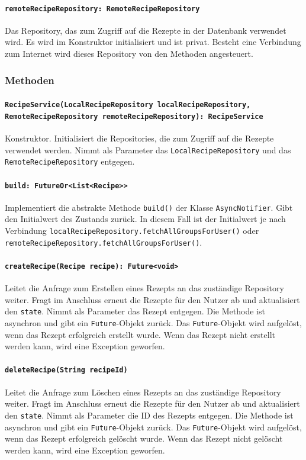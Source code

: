 \documentclass{entwurfsheft}
\begin{document}
\paragraph{\texttt{remoteRecipeRepository: RemoteRecipeRepository}}
Das Repository, das zum Zugriff auf die Rezepte in der Datenbank verwendet wird. Es wird im Konstruktor initialisiert und ist privat. Besteht eine Verbindung zum Internet wird dieses Repository von den Methoden angesteuert.
\subsubsection*{Methoden}
\paragraph{\texttt{RecipeService(LocalRecipeRepository localRecipeRepository, RemoteRecipeRepository remoteRecipeRepository): RecipeService\\}}
Konstruktor. Initialisiert die Repositories, die zum Zugriff auf die Rezepte verwendet werden. Nimmt als Parameter das \texttt{LocalRecipeReposi\-tory} und das \texttt{RemoteRecipeRepository} entgegen.
\paragraph{\texttt{build: FutureOr<List<Recipe>>}}
Implementiert die abstrakte Methode \texttt{build()} der Klasse \texttt{AsyncNotifier}. Gibt den Initialwert des Zustands zurück. In diesem Fall ist der Initialwert je nach Verbindung \texttt{localRecipeRepository.fetchAllGroupsForUser()} oder \texttt{remoteRecipeRe\-pository.fetchAllGroupsForUser()}.
\paragraph{\texttt{createRecipe(Recipe recipe): Future<void>}}
Leitet die Anfrage zum Erstellen eines Rezepts an das zuständige Repository weiter. Fragt im Anschluss erneut die Rezepte für den Nutzer ab und aktualisiert den \texttt{state}. Nimmt als Parameter das Rezept entgegen. Die Methode ist asynchron und gibt ein \texttt{Future}-Objekt zurück. Das \texttt{Future}-Objekt wird aufgelöst, wenn das Rezept erfolgreich erstellt wurde. Wenn das Rezept nicht erstellt werden kann, wird eine Exception geworfen.
\paragraph{\texttt{deleteRecipe(String recipeId)}}
Leitet die Anfrage zum Löschen eines Rezepts an das zuständige Repository weiter. Fragt im Anschluss erneut die Rezepte für den Nutzer ab und aktualisiert den \texttt{state}. Nimmt als Parameter die ID des Rezepts entgegen. Die Methode ist asynchron und gibt ein \texttt{Future}-Objekt zurück. Das \texttt{Future}-Objekt wird aufgelöst, wenn das Rezept erfolgreich gelöscht wurde. Wenn das Rezept nicht gelöscht werden kann, wird eine Exception geworfen.
\end{document}
